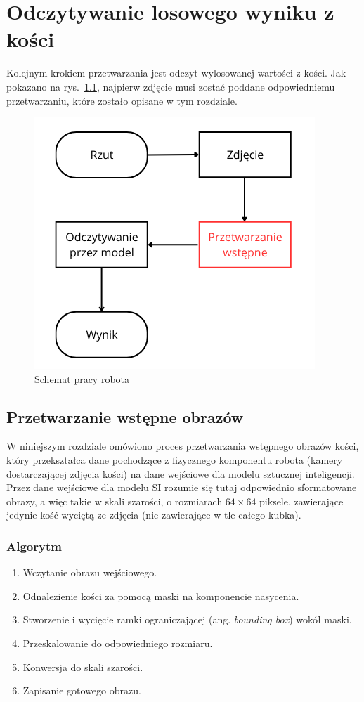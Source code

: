 \chapter{Odczytywanie losowego wyniku z kości}\label{ch:odczytywanie-losowego-wyniku-z-kosci}

Kolejnym krokiem przetwarzania jest odczyt wylosowanej wartości z kości.
Jak pokazano na rys.~\ref{fig:schemat_workflow},
najpierw zdjęcie musi zostać poddane odpowiedniemu przetwarzaniu, które zostało opisane w tym rozdziale.

\begin{figure}[H]
    \centering
    \includegraphics[width=0.5\linewidth]{chapters/04-czytanie/figures/schemat.png}
    \caption{Schemat pracy robota}
    \label{fig:schemat_workflow}
\end{figure}

\section{Przetwarzanie wstępne obrazów}\label{sec:preprocessing}

W niniejszym rozdziale omówiono proces przetwarzania wstępnego obrazów kości,
który przekształca dane pochodzące z fizycznego komponentu robota (kamery dostarczającej zdjęcia kości) na dane wejściowe dla modelu sztucznej inteligencji.
Przez dane wejściowe dla modelu SI rozumie się tutaj odpowiednio sformatowane obrazy, a więc takie w skali szarości,
o rozmiarach $64\times64$ piksele, zawierające jedynie kość wyciętą ze zdjęcia (nie zawierające w tle całego kubka).

\subsection{Algorytm}\label{subsec:algorytm}

\begin{enumerate}
    \item Wczytanie obrazu wejściowego.
    \item Odnalezienie kości za pomocą maski na komponencie nasycenia.
    \item Stworzenie i wycięcie ramki ograniczającej (ang. \textit{bounding box}) wokół maski.
    \item Przeskalowanie do odpowiedniego rozmiaru.
    \item Konwersja do skali szarości.
    \item Zapisanie gotowego obrazu.
\end{enumerate}


